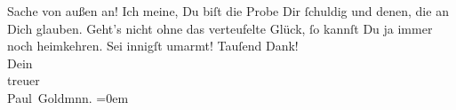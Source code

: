                Sache von außen an! Ich meine, Du biſt die Probe Dir ſchuldig und denen, die an Dich
               glauben. Geht’s nicht \strikeout{\textcolor{gray}{×}} ohne das verteufelte Glück, ſo kannſt Du ja immer noch heimkehren.\pend
           \pstart
           Sei innigſt umarmt! Tauſend Dank! {\\[\baselineskip]}Dein{\\[\baselineskip]}treuer{\\[\baselineskip]}\spacefill\mbox{Paul Goldmnn.}\pend
           \leftskip=0em{}\endnumbering{}\begin{anhang}\end{anhang}
      